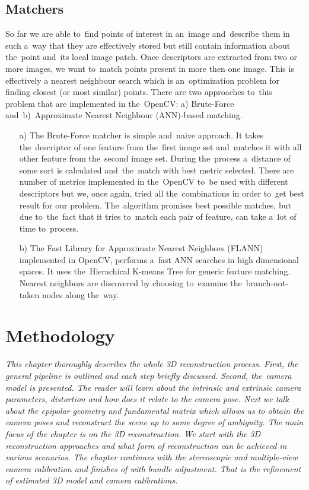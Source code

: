 \section{Matchers}
\label{sec:matchers}
So far we are able to~find points of interest in an~image and~describe them in such a~way that they are effectively stored but still contain information about the~point and~its local image patch. Once descriptors are extracted from two or more images, we want to~match points present in more then one image. This is effectively a nearest neighbour search\cite{nearest_neighbour_search} which is an~optimization problem for finding closest (or most similar) points. There are two approaches to~this problem that are implemented in the~OpenCV: a) Brute-Force and~b)~Approximate Nearest Neighbour (ANN)-based matching.

\begin{itemize}
	\item[a)] The Brute-Force matcher is simple and~naive approach. It takes the~descriptor of one feature from the~first image set and~matches it with all other feature from the~second image set. During the~process a~distance of some sort is calculated and~the~match with best metric selected. There are number of metrics implemented in the~OpenCV to~be used with different descriptors but we, once again, tried all the~combinations in order to~get best result for our problem. The~algorithm promises best possible matches, but due to~the~fact that it tries to~match each pair of feature, can take a~lot of time to~process. 

	\item[b)] The Fast Library for Approximate Nearest Neighbors (FLANN) implemented in OpenCV, performs a~fast ANN searches in high dimensional spaces. It uses the~Hierachical K-means Tree for generic feature matching. Nearest neighbors are discovered by choosing to~examine the~branch-not-taken nodes along the~way. \cite{www:flann}
\end{itemize}

\chapter{Methodology}
\label{chapter:methodology}
\textit{This chapter thoroughly describes the whole 3D reconstruction process. First, the general pipeline is outlined and each step briefly discussed. Second, the~camera model is presented. The reader will learn about the intrinsic and extrinsic camera parameters, distortion and how does it relate to the camera pose. Next we talk about the epipolar geometry and fundamental matrix which allows us to obtain the camera poses and reconstruct the scene up to some degree of ambiguity. The main focus of the chapter is on the 3D reconstruction. We start with the 3D reconstruction approaches and what form of reconstruction can be achieved in various scenarios. The chapter continues with the stereoscopic and multiple-view camera calibration and finishes of with bundle adjustment. That is the refinement of estimated 3D model and camera calibrations.}

